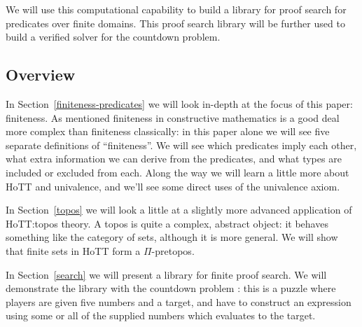 We will use this computational capability to build a library for proof search
for predicates over finite domains.
This proof search library will be further used to build a verified solver for
the countdown problem.

\subsection{Overview}
In Section~\ref{finiteness-predicates} we will look in-depth at the focus of
this paper: finiteness.
As mentioned finiteness in constructive mathematics is a good deal more complex
than finiteness classically:
in this paper alone we will see five separate definitions of ``finiteness''.
We will see which predicates imply each other, what extra information we can
derive from the predicates, and what types are included or excluded from each.
Along the way we will learn a little more about HoTT and univalence, and we'll
see some direct uses of the univalence axiom.

In Section~\ref{topos} we will look a little at a slightly more advanced
application of HoTT:\@ topos theory.
A topos is quite a complex, abstract object: it behaves something like the
category of sets, although it is more general.
We will show that finite sets in HoTT form a $\Pi$-pretopos.

In Section~\ref{search} we will present a library for finite proof search.
We will demonstrate the library with the countdown problem
\citep{huttonCountdownProblem2002}: this is a puzzle where
players are given five numbers and a target, and have to construct an expression
using some or all of the supplied numbers which evaluates to the target.

